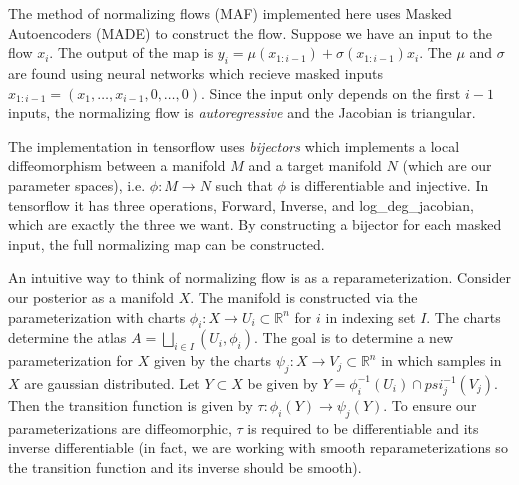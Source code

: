 The method of normalizing flows (MAF) implemented here uses Masked Autoencoders (MADE) to construct the flow. 
Suppose we have an input to the flow $x_i$. 
The output of the map is $y_i= \mu(x_{1:i-1})+\sigma(x_{1:i-1})x_i$. 
The $\mu$ and $\sigma$ are found using neural networks which recieve masked inputs $x_{1:i-1}=(x_1,\ldots,x_{i-1},0,\ldots,0)$. 
Since the input only depends on the first $i-1$ inputs, the normalizing flow is \textit{autoregressive} and the Jacobian is triangular.

The implementation in tensorflow uses \textit{bijectors} which implements a local diffeomorphism between a manifold $M$ and a target manifold $N$ (which are our parameter spaces), i.e. $\phi:M\rightarrow N$ such that $\phi$ is differentiable and injective. 
In tensorflow it has three operations, Forward, Inverse, and log\_deg\_jacobian, which are exactly the three we want. 
By constructing a bijector for each masked input, the full normalizing map can be constructed.

An intuitive way to think of normalizing flow is as a reparameterization. Consider our posterior as a manifold $X$. The manifold is constructed via the parameterization with charts $\phi_i:X\rightarrow U_i \subset \mathbb{R}^n$ for $i$ in indexing set $I$. 
The charts determine the atlas $A = \bigsqcup\limits_{i\in I} (U_i,\phi_i)$. 
The goal is to determine a new parameterization for $X$ given by the charts $\psi_j:X\rightarrow V_j \subset \mathbb{R}^n$ in which samples in $X$ are gaussian distributed. 
Let $Y \subset X$ be given by $Y = \phi_i^{-1}(U_i) \cap psi_j^{-1}(V_j)$. 
Then the transition function is given by $\tau:\phi_i(Y)\rightarrow\psi_j(Y)$. 
To ensure our parameterizations are diffeomorphic, $\tau$ is required to be differentiable and its inverse differentiable 
(in fact, we are working with smooth reparameterizations so the transition function and its inverse should be smooth).

